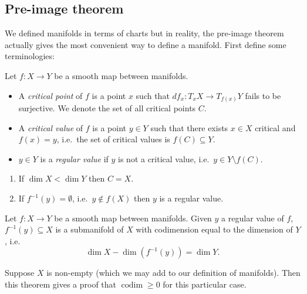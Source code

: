 \documentclass[a4paper]{article}
\DeclareMathOperator{\codim}{codim}
\begin{document}
\subsection{Pre-image theorem}

We defined manifolds in terms of charts but in reality, the pre-image theorem actually gives the most convenient way to define a manifold. First define some terminologies:

\begin{definition}
  Let \(f: X \to Y\) be a smooth map between manifolds.
  \begin{itemize}
  \item A \emph{critical point} of \(f\) is a point \(x\) such that \(df_x: T_xX \to T_{f(x)}Y\) fails to be surjective. We denote the set of all critical points \(C\).
  \item A \emph{critical value} of \(f\) is a point \(y \in Y\) such that there exists \(x \in X\) critical and \(f(x) = y\), i.e.\ the set of critical values is \(f(C) \subseteq Y\).
  \item \(y \in Y\) is a \emph{regular value} if \(y\) is not a critical value, i.e.\ \(y \in Y \setminus f(C)\).
  \end{itemize}
\end{definition}

\begin{remark}\leavevmode
  \begin{enumerate}
  \item If \(\dim X < \dim Y\) then \(C = X\).
  \item If \(f^{-1}(y) = \emptyset\), i.e.\ \(y \notin f(X)\) then \(y\) is a regular value.
  \end{enumerate}
\end{remark}

\begin{theorem}
  Let \(f: X \to Y\) be a smooth map between manifolds. Given \(y\) a regular value of \(f\), \(f^{-1}(y) \subseteq X\) is a submanifold of \(X\) with codimension equal to the dimension of \(Y\), i.e.
  \[
    \dim X - \dim (f^{-1}(y)) = \dim Y.
  \]
\end{theorem}

\begin{remark}
  Suppose \(X\) is non-empty (which we may add to our definition of manifolds). Then this theorem gives a proof that \(\codim \geq 0\) for this particular case.
\end{remark}
\end{document}
